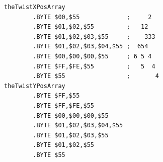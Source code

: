 \begin{lstlisting}[caption=Source code for the Twist]
theTwistXPosArray                        
        .BYTE $00,$55             ;     2  
        .BYTE $01,$02,$55         ;   12   
        .BYTE $01,$02,$03,$55     ;    333 
        .BYTE $01,$02,$03,$04,$55 ;  654   
        .BYTE $00,$00,$00,$55     ; 6 5 4  
        .BYTE $FF,$FE,$55         ;   5  4 
        .BYTE $55                 ;       4
theTwistYPosArray
        .BYTE $FF,$55
        .BYTE $FF,$FE,$55
        .BYTE $00,$00,$00,$55
        .BYTE $01,$02,$03,$04,$55
        .BYTE $01,$02,$03,$55
        .BYTE $01,$02,$55
        .BYTE $55
\end{lstlisting}




\clearpage
